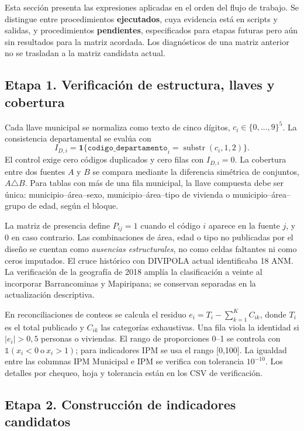 Esta sección presenta las expresiones aplicadas en el orden del flujo de trabajo. Se distingue entre procedimientos \textbf{ejecutados}, cuya evidencia está en scripts y salidas, y procedimientos \textbf{pendientes}, especificados para etapas futuras pero aún sin resultados para la matriz acordada. Los diagnósticos de una matriz anterior no se trasladan a la matriz candidata actual.

\subsection{Etapa 1. Verificación de estructura, llaves y cobertura}

Cada llave municipal se normaliza como texto de cinco dígitos, $c_i\in\{0,\ldots,9\}^5$. La consistencia departamental se evalúa con
\[
I_{D,i}=\mathbf{1}\{\texttt{codigo\_departamento}_i=\operatorname{substr}(c_i,1,2)\}.
\]
El control exige cero códigos duplicados y cero filas con $I_{D,i}=0$. La cobertura entre dos fuentes $A$ y $B$ se compara mediante la diferencia simétrica de conjuntos, $A\triangle B$. Para tablas con más de una fila municipal, la llave compuesta debe ser única: municipio--área--sexo, municipio--área--tipo de vivienda o municipio--área--grupo de edad, según el bloque.

La matriz de presencia define $P_{ij}=1$ cuando el código $i$ aparece en la fuente $j$, y $0$ en caso contrario. Las combinaciones de área, edad o tipo no publicadas por el diseño se cuentan como \emph{ausencias estructurales}, no como celdas faltantes ni como ceros imputados. El cruce histórico con DIVIPOLA actual identificaba 18 ANM. La verificación de la geografía de 2018 amplía la clasificación a veinte al incorporar Barrancominas y Mapiripana; se conservan separadas en la actualización descriptiva.

En reconciliaciones de conteos se calcula el residuo $e_i=T_i-\sum_{k=1}^{K}C_{ik}$, donde $T_i$ es el total publicado y $C_{ik}$ las categorías exhaustivas. Una fila viola la identidad si $|e_i|>0,5$ personas o viviendas. El rango de proporciones 0--1 se controla con $\mathbb{1}(x_i<0\ \text{o}\ x_i>1)$; para indicadores IPM se usa el rango [0,100]. La igualdad entre las columnas IPM Municipal e IPM se verifica con tolerancia $10^{-10}$. Los detalles por chequeo, hoja y tolerancia están en los CSV de verificación.

\subsection{Etapa 2. Construcción de indicadores candidatos}

